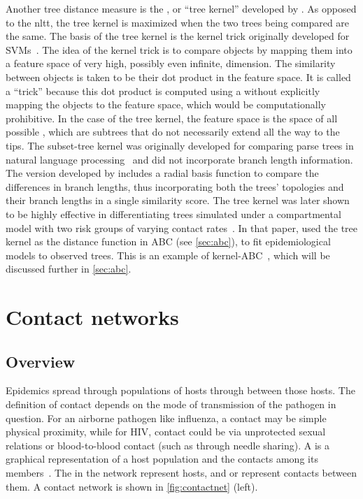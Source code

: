 Another tree distance measure is the , or ``tree
kernel'' developed by \textcite{poon2013mapping}. As opposed to the \gls{nltt},
the tree kernel is maximized when the two trees being compared are the same.
The basis of the tree kernel is the kernel trick originally developed for
\glspl{SVM}~\autocite{burges1998tutorial}. The idea of the kernel trick is to
compare objects by mapping them into a feature space of very high, possibly
even infinite, dimension. The similarity between objects is taken to be their
dot product in the feature space. It is called a ``trick'' because this dot
product is computed using a  without explicitly mapping
the objects to the feature space, which would be computationally prohibitive.
In the case of the tree kernel, the feature space is the space of all possible
, which are subtrees that do not necessarily extend all the
way to the tips. The subset-tree kernel was originally developed for comparing
parse trees in natural language processing~\autocite{collins2002new} and did
not incorporate branch length information. The version developed by
\textcite{poon2013mapping} includes a radial basis function to compare the
differences in branch lengths, thus incorporating both the trees' topologies
and their branch lengths in a single similarity score. The tree kernel was
later shown to be highly effective in differentiating trees simulated under a
compartmental model with two risk groups of varying contact
rates~\autocite{poon2015phylodynamic}. In that paper,
\citeauthor{poon2015phylodynamic} used the tree kernel as the distance function
in \gls{ABC} (see \cref{sec:abc}), to fit epidemiological models to observed
trees. This is an example of kernel-ABC~\autocite{nakagome2013kernel}, which
will be discussed further in \cref{sec:abc}.

\section{Contact networks}
\label{sec:contactnet}

\subsection{Overview}
\label{subsec:netoverview}

Epidemics spread through populations of hosts through  between
those hosts. The definition of contact depends on the mode of transmission of
the pathogen in question. For an airborne pathogen like influenza, a contact
may be simple physical proximity, while for \gls{HIV}, contact could be via
unprotected sexual relations or blood-to-blood contact (such as through needle
sharing). A  is a graphical representation of a host
population and the contacts among its members~\autocite{klovdahl1985social,
morris1993epidemiology, keeling2005networks}. The  in the network
represent hosts, and  or  represent contacts between
them. A contact network is shown in \cref{fig:contactnet} (left).

